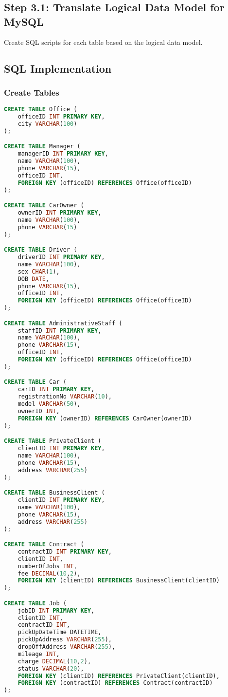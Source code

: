 \documentclass[a4paper,12pt]{article}
\begin{document}
\subsection*{Step 3.1: Translate Logical Data Model for MySQL}
Create SQL scripts for each table based on the logical data model.

\subsection*{SQL Implementation}

\subsubsection*{Create Tables}
\begin{lstlisting}[language=SQL]
CREATE TABLE Office (
    officeID INT PRIMARY KEY,
    city VARCHAR(100)
);

CREATE TABLE Manager (
    managerID INT PRIMARY KEY,
    name VARCHAR(100),
    phone VARCHAR(15),
    officeID INT,
    FOREIGN KEY (officeID) REFERENCES Office(officeID)
);

CREATE TABLE CarOwner (
    ownerID INT PRIMARY KEY,
    name VARCHAR(100),
    phone VARCHAR(15)
);

CREATE TABLE Driver (
    driverID INT PRIMARY KEY,
    name VARCHAR(100),
    sex CHAR(1),
    DOB DATE,
    phone VARCHAR(15),
    officeID INT,
    FOREIGN KEY (officeID) REFERENCES Office(officeID)
);

CREATE TABLE AdministrativeStaff (
    staffID INT PRIMARY KEY,
    name VARCHAR(100),
    phone VARCHAR(15),
    officeID INT,
    FOREIGN KEY (officeID) REFERENCES Office(officeID)
);

CREATE TABLE Car (
    carID INT PRIMARY KEY,
    registrationNo VARCHAR(10),
    model VARCHAR(50),
    ownerID INT,
    FOREIGN KEY (ownerID) REFERENCES CarOwner(ownerID)
);

CREATE TABLE PrivateClient (
    clientID INT PRIMARY KEY,
    name VARCHAR(100),
    phone VARCHAR(15),
    address VARCHAR(255)
);

CREATE TABLE BusinessClient (
    clientID INT PRIMARY KEY,
    name VARCHAR(100),
    phone VARCHAR(15),
    address VARCHAR(255)
);

CREATE TABLE Contract (
    contractID INT PRIMARY KEY,
    clientID INT,
    numberOfJobs INT,
    fee DECIMAL(10,2),
    FOREIGN KEY (clientID) REFERENCES BusinessClient(clientID)
);

CREATE TABLE Job (
    jobID INT PRIMARY KEY,
    clientID INT,
    contractID INT,
    pickUpDateTime DATETIME,
    pickUpAddress VARCHAR(255),
    dropOffAddress VARCHAR(255),
    mileage INT,
    charge DECIMAL(10,2),
    status VARCHAR(20),
    FOREIGN KEY (clientID) REFERENCES PrivateClient(clientID),
    FOREIGN KEY (contractID) REFERENCES Contract(contractID)
);
\end{lstlisting}
\end{document}
